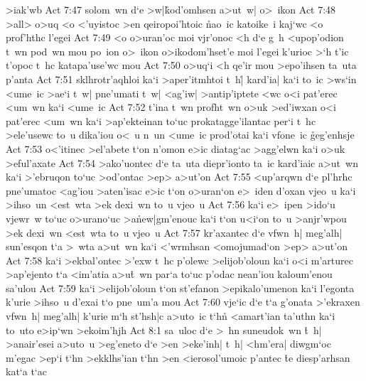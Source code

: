 >iak'wb\bibvsend
\vs Act 7:47
solom~wn
d`e
>w|\r{k}od'omhsen
a>ut~w|
o>~ikon\bibvsend
\vs Act 7:48
>all>
o>uq
<o
<'uyistoc
>en
qeiropoi'htoic
\r{n}ao~ic
katoike~i
kaj`wc
<o
prof'hthc
l'egei\bibvsend
\vs Act 7:49
<o
o>uran'oc
moi
vjr'onoc
<h
d`e
g~h
<upop'odion
t~wn
pod~wn
mou
po~ion
o>~ikon
o>ikodom'hset'e
moi
l'egei
k'urioc
>`h
t'ic
t'opoc
t~hc
katapa'use'wc
mou\bibvsend
\vs Act 7:50
o>uq`i
<h
qe'ir
mou
>epo'ihsen
ta~uta
p'anta\bibvsend
\vs Act 7:51
sklhrotr'aqhloi
ka`i
>aper'itmhtoi
t~h|\r{}
kard'ia|
ka`i
to~ic
>ws`in
<ume~ic
>ae`i
t~w|
pne'umati
t~w|
<ag'iw|
>antip'iptete
<wc
o<i
pat'erec
<um~wn
ka`i
<ume~ic\bibvsend
\vs Act 7:52
t'ina
t~wn
profht~wn
o>uk
>ed'iwxan
o<i
pat'erec
<um~wn
ka`i
>ap'ekteinan
to`uc
prokatagge'ilantac
per`i
t~hc
>ele'usewc
to~u
dika'iou
o<~u
n~un
<ume~ic
prod'otai
ka`i
vfone~ic
\r{g}eg'enhsje\bibvsend
{}
\vs Act 7:53
o<'itinec
>el'abete
t`on
n'omon
e>ic
diatag`ac
>agg'elwn
ka`i
o>uk
>eful'axate\bibvsend
\vs Act 7:54
>ako'uontec
d`e
ta~uta
diepr'ionto
ta~ic
kard'iaic
a>ut~wn
ka`i
>'ebruqon
to`uc
>od'ontac
>ep>
a>ut'on\bibvsend
\vs Act 7:55
<up'arqwn
d`e
pl'hrhc
pne'umatoc
<ag'iou
>aten'isac
e>ic
t`on
o>uran`on
e>~iden
d'oxan
vjeo~u
ka`i
>ihso~un
<est~wta
>ek
dexi~wn
to~u
vjeo~u\bibvsend
\vs Act 7:56
ka`i
e>~ipen
>ido`u
vjewr~w
to`uc
o>urano`uc
>a\r{n}ew|gm'enouc
ka`i
t`on
u<i`on
to~u
>anjr'wpou
>ek
dexi~wn
<est~wta
to~u
vjeo~u\bibvsend
\vs Act 7:57
kr'axantec
d`e
vfwn~h|
meg'alh|
sun'esqon
t`a
>~wta
a>ut~wn
ka`i
<'wrmhsan
<omojumad`on
>ep>
a>ut'on\bibvsend
\vs Act 7:58
ka`i
>ekbal'ontec
>'exw
t~hc
p'olewc
>elijob'oloun
ka`i
o<i
m'arturec
>ap'ejento
t`a
<im'atia
a>u\r{t}~wn
par`a
to`uc
p'odac
nean'iou
kaloum'enou
sa'ulou\bibvsend
\vs Act 7:59
ka`i
>elijob'oloun
t`on
st'efanon
>epikalo'umenon
ka`i
l'egonta
k'urie
>ihso~u
d'exai
t`o
pne~um'a
mou\bibvsend
\vs Act 7:60
vje`ic
d`e
t`a
g'onata
>'ekraxen
vfwn~h|
meg'alh|
k'urie
m`h
st'hsh|c
a>uto~ic
t`hn\r{}
<amart'ian
ta'uthn
ka`i
to~uto
e>ip`wn
>ekoim'hjh\bibvsend
\vs Act 8:1
sa~uloc
d`e
>~hn
suneudok~wn
\r{t}~h|
>anair'esei
a>uto~u
>eg'eneto
d`e
>en
>eke'inh|
t~h|
<hm'era|
diwgm`oc
m'egac
>ep`i
t`hn
>ekklhs'ian
t`hn
>en
<ierosol'umoic
p'antec
\r{t}e
diesp'arhsan
kat`a
t`ac
